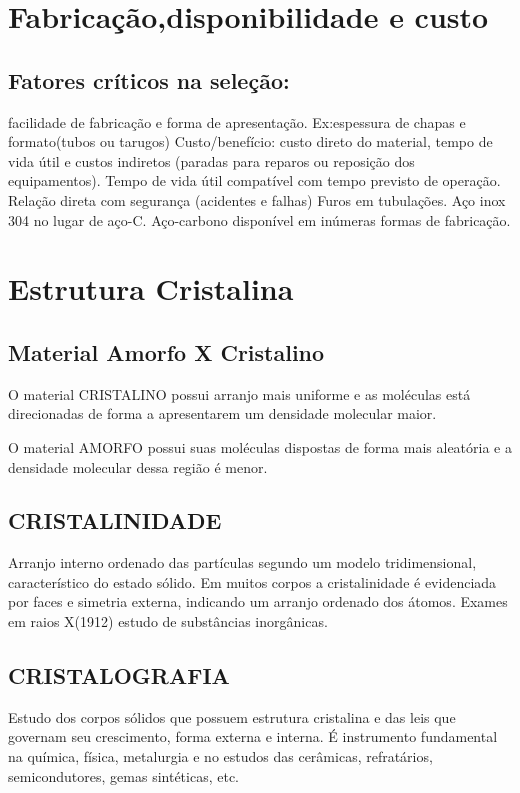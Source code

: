 \section{Fabricação,disponibilidade e custo}


\subsection*{Fatores críticos na seleção:} facilidade de fabricação e forma de apresentação. Ex:espessura de chapas e formato(tubos ou tarugos)
Custo/benefício: custo direto do material, tempo de vida útil e custos indiretos (paradas para reparos ou reposição dos equipamentos).
Tempo de vida útil compatível com tempo previsto de operação.
Relação direta com segurança (acidentes e falhas)
Furos em tubulações.
Aço inox 304 no lugar de aço-C.
Aço-carbono disponível em inúmeras formas de fabricação.

\vspace{150px}

\section{Estrutura Cristalina}

\subsection*{Material Amorfo X Cristalino}
O material CRISTALINO possui arranjo mais uniforme e as moléculas está direcionadas de forma a apresentarem um densidade molecular maior. 

O material AMORFO possui suas moléculas dispostas de forma mais aleatória e a densidade molecular dessa região é menor.


\subsection*{CRISTALINIDADE} Arranjo interno ordenado das partículas segundo um modelo tridimensional, característico do estado sólido. Em muitos corpos a cristalinidade é evidenciada por faces e simetria externa, indicando um arranjo ordenado dos átomos. Exames em raios X(1912) estudo de substâncias inorgânicas.

\subsection*{CRISTALOGRAFIA} Estudo dos corpos sólidos que possuem estrutura cristalina e das leis que governam seu crescimento, forma externa e interna. É instrumento fundamental na química, física, metalurgia e no estudos das cerâmicas, refratários, semicondutores, gemas sintéticas, etc.


